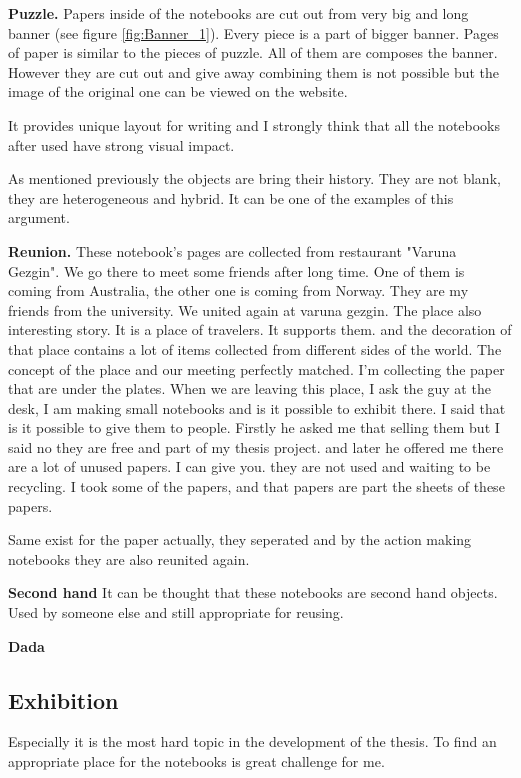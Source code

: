 \textbf{Puzzle.} Papers inside of the notebooks are cut out from very big and long banner (see figure \ref{fig:Banner_1}). Every piece is a part of bigger banner. Pages of paper is similar to the pieces of puzzle. All of them are composes the banner. However they are cut out and give away combining them is not possible but the image of the original one can be viewed on the website.

It provides unique layout for writing and I strongly think that all the notebooks after used have strong visual impact.

As mentioned previously the objects are bring their history. They are not blank, they are heterogeneous and hybrid. It can be one of the examples of this argument. 

\textbf{Reunion.} These notebook's pages are collected from restaurant "Varuna Gezgin". We go there to meet some friends after long time. One of them is coming from Australia, the other one is coming from Norway. They are my friends from the university. We united again at varuna gezgin. The place also interesting story. It is a place of travelers. It supports them. and the decoration of that place contains a lot of items collected from different sides of the world. The concept of the place and our meeting perfectly matched. I'm collecting the paper that are under the plates. When we are leaving this place, I ask the guy at the desk, I am making small notebooks and is it possible to exhibit there. I said that is it possible to give them to people. Firstly he asked me that selling them but I said no they are free and part of my thesis project. and later he offered me there are a lot of unused papers. I can give you. they are not used and waiting to be recycling. I took some of the papers, and that papers are part the sheets of these papers.

Same exist for the paper actually, they seperated and by the action making notebooks they are also reunited again.

\textbf{Second hand} It can be thought that these notebooks are second hand objects. Used by someone else and still appropriate for reusing.

\textbf{Dada} 

%
%
\subsection{Exhibition}
Especially it is the most hard topic in the development of the thesis. To find an appropriate place for the notebooks is great challenge for me.

